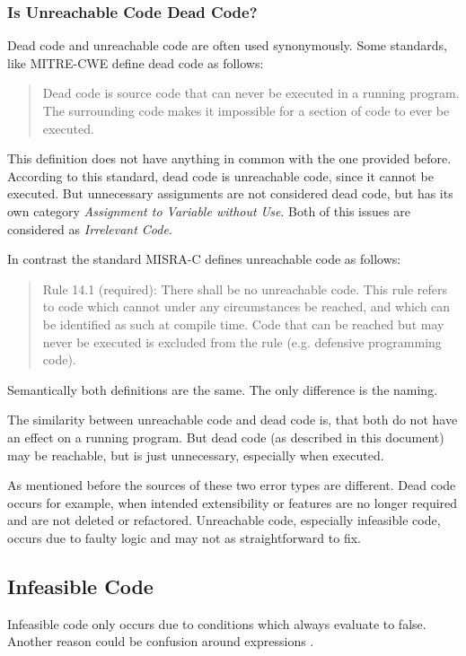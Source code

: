 \subsubsection{Is Unreachable Code Dead Code?}
Dead code and unreachable code are often used synonymously. 
Some standards, like MITRE-CWE \cite{CWECWE561Dead} define dead code as follows:
\begin{quote}
	Dead code is source code that can never be executed in a running program. The surrounding code makes it impossible for a section of code to ever be executed.
\end{quote}
This definition does not have anything in common with the one provided before. According to this standard, dead code is unreachable code, since it cannot be executed. But unnecessary assignments are not considered dead code, but has its own category \emph{Assignment to Variable without Use}.
Both of this issues are considered as \emph{Irrelevant Code}.


In contrast the standard MISRA-C \cite{motorindustrysoftwarereliabilityassociationMISRAC2004Guidelines2008} defines unreachable code as follows:
\begin{quote}
Rule 14.1 (required): There shall be no unreachable code.
This  rule  refers  to  code  which  cannot  under  any  circumstances  be  reached,  and  which  can  be 
identified as such at compile time. Code that can be reached but may never be executed is excluded 
from the rule (e.g. defensive programming code).	
\end{quote}
Semantically both definitions are the same. The only difference is the naming.


The similarity between unreachable code and dead code is, that both do not have an effect on a running program. But dead code (as described in this document) may be reachable, but is just unnecessary, especially when executed. 


As mentioned before the sources of these two error types are different.
Dead code occurs for example, when intended extensibility or features are no longer required and are not deleted or refactored.
Unreachable code, especially infeasible code, occurs due to faulty logic and may not as straightforward to fix.
\subsection{Infeasible Code}
\label{sub:infeasible code}

Infeasible code only occurs due to conditions which always evaluate to false. Another reason could be confusion around expressions \cite{Eichberg_2015}.


